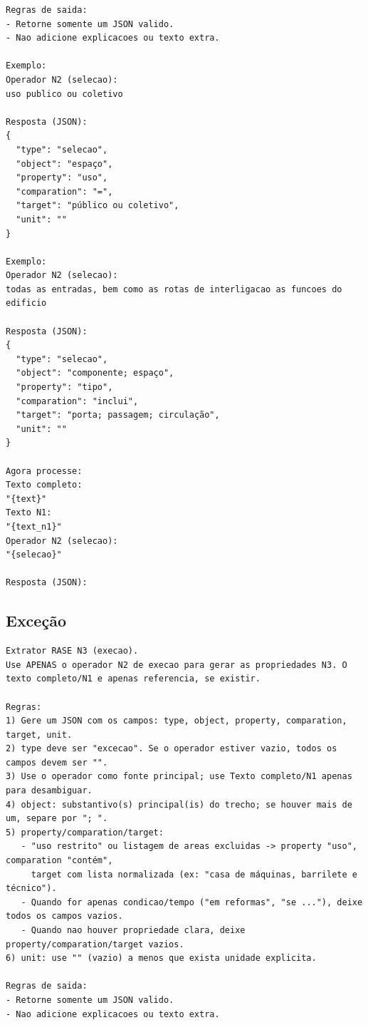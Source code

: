 \begin{apendicesenv}
\begin{lstlisting}[caption={\textit{Prompt} do operador Seleção (N3): \texttt{prompts/n3\_selecao.txt}.}, label={lst:n3-sel}]
Regras de saida:
- Retorne somente um JSON valido.
- Nao adicione explicacoes ou texto extra.

Exemplo:
Operador N2 (selecao):
uso publico ou coletivo

Resposta (JSON):
{
  "type": "selecao",
  "object": "espaço",
  "property": "uso",
  "comparation": "=",
  "target": "público ou coletivo",
  "unit": ""
}

Exemplo:
Operador N2 (selecao):
todas as entradas, bem como as rotas de interligacao as funcoes do edificio

Resposta (JSON):
{
  "type": "selecao",
  "object": "componente; espaço",
  "property": "tipo",
  "comparation": "inclui",
  "target": "porta; passagem; circulação",
  "unit": ""
}

Agora processe:
Texto completo:
"{text}"
Texto N1:
"{text_n1}"
Operador N2 (selecao):
"{selecao}"

Resposta (JSON):
\end{lstlisting}

\subsection{Exceção}

\begin{lstlisting}[caption={\textit{Prompt} do operador Exceção (N3): \texttt{prompts/n3\_execao.txt}.}, label={lst:n3-exc}]
Extrator RASE N3 (execao).
Use APENAS o operador N2 de execao para gerar as propriedades N3. O texto completo/N1 e apenas referencia, se existir.

Regras:
1) Gere um JSON com os campos: type, object, property, comparation, target, unit.
2) type deve ser "excecao". Se o operador estiver vazio, todos os campos devem ser "".
3) Use o operador como fonte principal; use Texto completo/N1 apenas para desambiguar.
4) object: substantivo(s) principal(is) do trecho; se houver mais de um, separe por "; ".
5) property/comparation/target:
   - "uso restrito" ou listagem de areas excluidas -> property "uso", comparation "contém",
     target com lista normalizada (ex: "casa de máquinas, barrilete e técnico").
   - Quando for apenas condicao/tempo ("em reformas", "se ..."), deixe todos os campos vazios.
   - Quando nao houver propriedade clara, deixe property/comparation/target vazios.
6) unit: use "" (vazio) a menos que exista unidade explicita.

Regras de saida:
- Retorne somente um JSON valido.
- Nao adicione explicacoes ou texto extra.


\end{lstlisting}
\end{apendicesenv}
